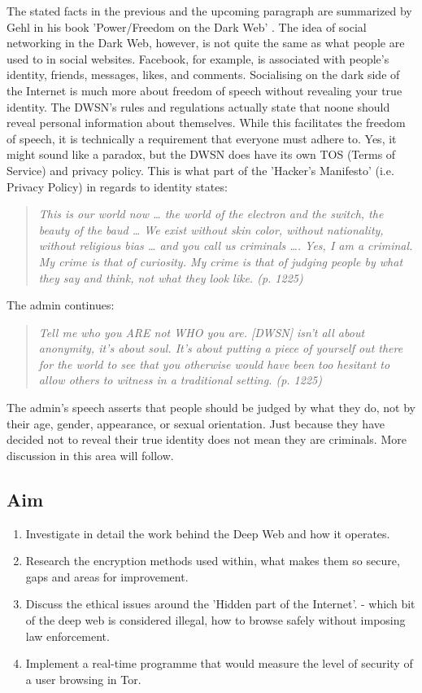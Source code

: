 \documentclass[a4paper, 12pt, titlepage]{article}
\begin{document}
The stated facts in the previous and the upcoming paragraph are summarized by Gehl in his book 'Power/Freedom on the Dark Web' \cite{PowerFreedom}. The idea of social networking in the Dark Web, however, is not quite the same as what people are used to in social websites. Facebook, for example, is associated with people's identity, friends, messages, likes, and comments. Socialising on the dark side of the Internet is much more about freedom of speech without revealing your true identity. The DWSN's rules and regulations actually state that noone should reveal personal information about themselves. While this facilitates the freedom of speech, it is technically a requirement that everyone must adhere to. Yes, it might sound like a paradox, but the DWSN does have its own TOS (Terms of Service) and privacy policy. This is what part of the 'Hacker's Manifesto' (i.e. Privacy Policy)  in regards to identity states:

\begin{quote}
\textit{This is our world now … the world of the electron and the switch, the beauty of the baud …
We exist without skin color, without nationality, without religious bias … and you call us
criminals …. Yes, I am a criminal. My crime is that of curiosity. My crime is that of judging
people by what they say and think, not what they look like. (p. 1225) \cite{PowerFreedom}}
\end{quote}
The admin continues:
\begin{quote}
\textit{Tell me who you ARE not WHO you are. [DWSN] isn't all about anonymity, it's about soul.
It’s about putting a piece of yourself out there for the world to see that you otherwise would
have been too hesitant to allow others to witness in a traditional setting. (p. 1225) \cite{PowerFreedom}}
\end{quote}
The admin's speech asserts that people should be judged by what they do, not by their age, gender, appearance, or sexual orientation. Just because they have decided not to reveal their true identity does not mean they are criminals. More discussion in this area will follow.

\subsection{Aim}
\begin{enumerate}
\item{Investigate in detail the work behind the Deep Web and how it operates.}
\item{Research the encryption methods used within, what makes them so secure, gaps and areas for improvement.}
\item{Discuss the ethical issues around the 'Hidden part of the Internet'. - which bit of the deep web is considered illegal, how to browse safely without imposing law enforcement.}
\item{Implement a real-time programme that would measure the level of security of a user browsing in Tor.}
\end{enumerate}
\end{document}
